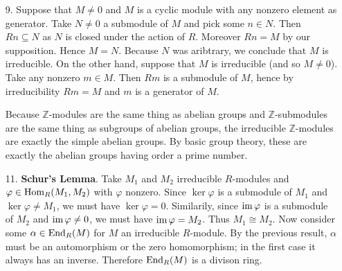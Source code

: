 \begin{enumerate}
\item[9.]
Suppose that $M\neq 0$ and $M$ is a cyclic module with any nonzero element as generator. Take $N\neq 0$ a submodule of $M$ and pick some $n\in N$. Then $Rn\subseteq N$ as $N$ is closed under the action of $R$. Moreover $Rn=M$ by our supposition. Hence $M=N$. Because $N$ was aribtrary, we conclude that $M$ is irreducible. On the other hand, suppose that $M$ is irreducible (and so $M\neq 0$). Take any nonzero $m\in M$. Then $Rm$ is a submodule of $M$, hence by irreducibility $Rm=M$ and $m$ is a generator of $M$.

Because $\mathbb{Z}$-modules are the same thing as abelian groups and $\mathbb{Z}$-submodules are the same thing as subgroups of abelian groups, the irreducible $\mathbb{Z}$-modules are exactly the simple abelian groups. By basic group theory, these are exactly the abelian groups having order a prime number.

\item[11.] \textbf{Schur's Lemma}. Take $M_1$ and $M_2$ irreducible $R$-modules and $\varphi\in\operatorname{Hom}_R(M_1,M_2)$ with $\varphi$ nonzero. Since $\ker\varphi$ is a submodule of $M_1$ and $\ker\varphi\neq M_1$, we must have $\ker\varphi=0$. Similarily, since $\operatorname{im}\varphi$ is a submodule of $M_2$ and $\operatorname{im}\varphi\neq 0$, we must have $\operatorname{im}\varphi=M_2$. Thus $M_1\cong M_2$. Now consider some $\alpha\in\operatorname{End}_R(M)$ for $M$ an irreducible $R$-module. By the previous result, $\alpha$ must be an automorphism or the zero homomorphism; in the first case it always has an inverse. Therefore $\operatorname{End}_R(M)$ is a divison ring.
\end{enumerate}
